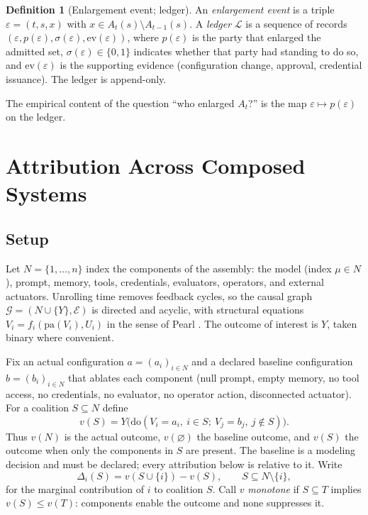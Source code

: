 \documentclass[11pt]{article}
\theoremstyle{definition}
\newtheorem{definition}[theorem]{Definition}
\begin{document}
\begin{definition}[Enlargement event; ledger]
An \emph{enlargement event} is a triple $\varepsilon=(t,s,x)$ with $x\in A_t(s)\setminus A_{t-1}(s)$. A \emph{ledger} $\mathcal{L}$ is a sequence of records $(\varepsilon,p(\varepsilon),\sigma(\varepsilon),\mathrm{ev}(\varepsilon))$, where $p(\varepsilon)$ is the party that enlarged the admitted set, $\sigma(\varepsilon)\in\{0,1\}$ indicates whether that party had standing to do so, and $\mathrm{ev}(\varepsilon)$ is the supporting evidence (configuration change, approval, credential issuance). The ledger is append-only.
\end{definition}

The empirical content of the question ``who enlarged $A_t$?'' is the map $\varepsilon\mapsto p(\varepsilon)$ on the ledger.

\section{Attribution Across Composed Systems}\label{app:B}

\subsection{Setup}

Let $N=\{1,\dots,n\}$ index the components of the assembly: the model (index $\mu\in N$), prompt, memory, tools, credentials, evaluators, operators, and external actuators. Unrolling time removes feedback cycles, so the causal graph $\mathcal{G}=(N\cup\{Y\},\mathcal{E})$ is directed and acyclic, with structural equations $V_i=f_i(\mathrm{pa}(V_i),U_i)$ in the sense of Pearl \cite{pearl2009}. The outcome of interest is $Y$, taken binary where convenient.

Fix an actual configuration $a=(a_i)_{i\in N}$ and a declared baseline configuration $b=(b_i)_{i\in N}$ that ablates each component (null prompt, empty memory, no tool access, no credentials, no evaluator, no operator action, disconnected actuator). For a coalition $S\subseteq N$ define
\[
v(S)=Y\bigl(\mathrm{do}(V_i=a_i,\ i\in S;\ V_j=b_j,\ j\notin S)\bigr).
\]
Thus $v(N)$ is the actual outcome, $v(\varnothing)$ the baseline outcome, and $v(S)$ the outcome when only the components in $S$ are present. The baseline is a modeling decision and must be declared; every attribution below is relative to it. Write
\[
\Delta_i(S)=v(S\cup\{i\})-v(S),\qquad S\subseteq N\setminus\{i\},
\]
for the marginal contribution of $i$ to coalition $S$. Call $v$ \emph{monotone} if $S\subseteq T$ implies $v(S)\le v(T)$: components enable the outcome and none suppresses it.
\end{document}
